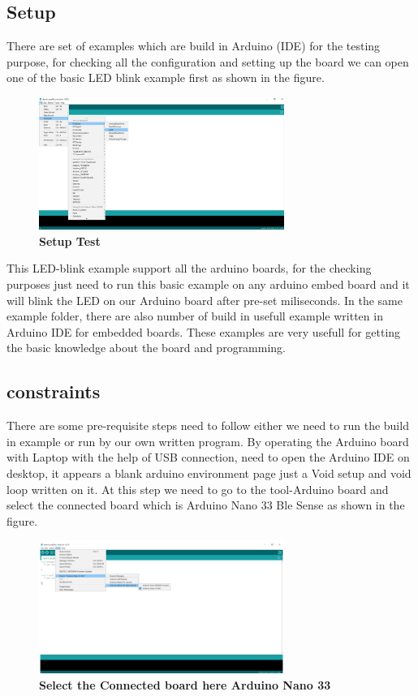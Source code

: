 \subsection{Setup}
There are set of examples which are build in Arduino (IDE) for the testing purpose, for checking all the configuration and setting up the board we can open one of the basic LED blink example first as shown in the figure.  


\begin{figure}[H]\centering
	\includegraphics[width=8cm]{Images/software/SetupTest}
	\caption{\textbf{Setup Test}}
	\label{fig:SetupTest}		
\end{figure}


This LED-blink example support all the arduino boards, for the checking purposes just need to run this basic example on any arduino embed board and it will blink the LED on our Arduino board after pre-set miliseconds. In the same example folder, there are also number of build in usefull example written in Arduino IDE for embedded boards. These examples are very usefull for getting the basic knowledge about the board and programming.

\subsection{constraints}
There are some pre-requisite steps need to follow either we need to run the build in example or run by our own written program. By operating the Arduino board with Laptop with the help of USB connection, need to open the Arduino IDE on desktop, it appears a blank arduino environment page just a Void setup and void loop written on it. At this step we need to go to the tool-Arduino board and select the connected board which is Arduino Nano 33 Ble Sense as shown in the figure.

\begin{figure}[H]\centering
	\includegraphics[width=8cm]{Images/software/SelecttheConnectedboardhereArduinoNano33}
	\caption{\textbf{Select the Connected board here Arduino Nano 33}}
	\label{fig:SelecttheConnectedboardhereArduinoNano33}		
\end{figure}


